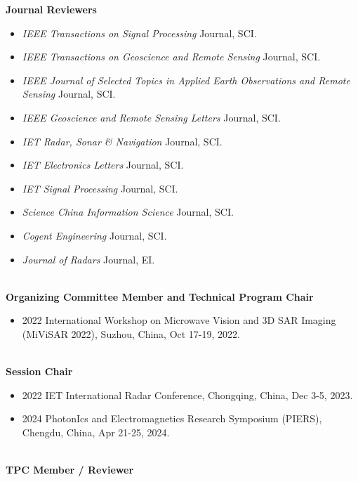 \documentclass[paper=a4,fontsize=11pt]{scrartcl}
\begin{document}
\textbf{Journal Reviewers} 
\begin{itemize}
	\item \textit{IEEE Transactions on Signal Processing} Journal, SCI.
	\item \textit{IEEE Transactions on Geoscience and Remote Sensing} Journal, SCI.
	\item \textit{IEEE Journal of Selected Topics in Applied Earth Observations and Remote Sensing} Journal, SCI.
	\item \textit{IEEE Geoscience and Remote Sensing Letters} Journal, SCI.
	\item \textit{IET Radar, Sonar \& Navigation} Journal, SCI.
	\item \textit{IET Electronics Letters} Journal, SCI.
	\item \textit{IET Signal Processing} Journal, SCI.
	\item \textit{Science China Information Science} Journal, SCI.
	\item \textit{Cogent Engineering} Journal, SCI.
	\item \textit{Journal of Radars} Journal, EI.
\end{itemize}
~\\
\textbf{Organizing Committee Member and Technical Program Chair} 
\begin{itemize}
	\item 2022 International Workshop on Microwave Vision and 3D SAR Imaging (MiViSAR 2022), Suzhou, China, Oct 17-19, 2022.
\end{itemize}
~\\
\textbf{Session Chair} 
\begin{itemize}
	\item 2022 IET International Radar Conference, Chongqing, China, Dec 3-5, 2023.
	\item 2024 PhotonIcs and Electromagnetics Research Symposium (PIERS), Chengdu, China, Apr 21-25, 2024.
\end{itemize}
~\\
\textbf{TPC Member / Reviewer}
\end{document}
